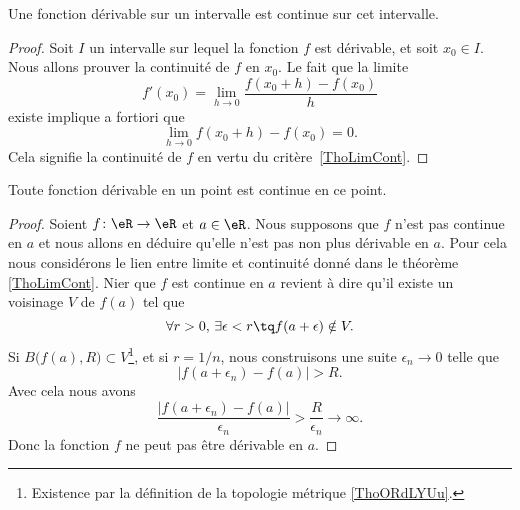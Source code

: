 \begin{proposition} \label{PropSFyxOWF}
    Une fonction dérivable sur un intervalle est continue sur cet intervalle.
\end{proposition}

\begin{proof}
    Soit \( I\) un intervalle sur lequel la fonction \( f\) est dérivable, et soit \( x_0\in I\). Nous allons prouver la continuité de \( f\) en \( x_0\). Le fait que la limite
    \begin{equation}
        f'(x_0)=\lim_{h\to 0} \frac{ f(x_0+h)-f(x_0) }{ h }
    \end{equation}
    existe implique a fortiori que
    \begin{equation}
        \lim_{h\to 0} f(x_0+h)-f(x_0)=0.
    \end{equation}
    Cela signifie la continuité de \( f\) en vertu du critère~\ref{ThoLimCont}.
\end{proof}

\begin{theorem} \label{THOooFFOZooCYGets}
  Toute fonction dérivable en un point est continue en ce point.
\end{theorem}

\begin{proof}
    Soient \( f\colon \eR\to \eR\) et \( a\in \eR\). Nous supposons que \( f\) n'est pas continue en \( a\) et nous allons en déduire qu'elle n'est pas non plus dérivable en \( a\). Pour cela nous considérons le lien entre limite et continuité donné dans le théorème \ref{ThoLimCont}. Nier que \( f\) est continue en \( a\) revient à dire qu'il existe un voisinage \( V\) de \( f(a)\) tel que
    \begin{equation}
        \forall r>0,\,\exists \epsilon<r \tq f(a+\epsilon)\notin V.
    \end{equation}
    Si \( B\big( f(a),R \big)\subset V\)\footnote{Existence par la définition de la topologie métrique \ref{ThoORdLYUu}.}, et si \( r=1/n\), nous construisons une suite \( \epsilon_n\to 0\) telle que
    \begin{equation}
        | f(a+\epsilon_n)-f(a) |>R.
    \end{equation}
    Avec cela nous avons
    \begin{equation}
        \frac{ | f(a+\epsilon_n)-f(a) | }{ \epsilon_n }>\frac{ R }{ \epsilon_n }\to \infty.
    \end{equation}
    Donc la fonction \( f\) ne peut pas être dérivable en \( a\).
\end{proof}

